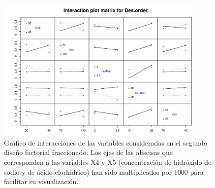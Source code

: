\begin{figure}[H]
    \centering
    \includegraphics[width=0.9\textwidth, trim={1cm 0.3cm 0 1cm}, clip]{chap5/figures/IAPlotFrF2-2.pdf}
    \caption[Gráfico de interacciones del segundo diseño factorial fraccionado.]{Gráfico de interacciones de las variables consideradas en el segundo diseño factorial fraccionado. Los ejes de las abscisas que corresponden a las variables X4 y X5 (concentración de hidróxido de sodio y de ácido clorhídrico) han sido multiplicados por 1000 para facilitar su visualización.}
    \label{fig:IAPLOTFrF2-2}
\end{figure}

